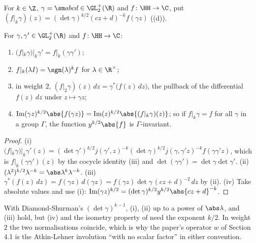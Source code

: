 \begin{definition}\label{def:modforms:slash}
For $k\in\Z$, $\gamma=\sm abcd\in\GL_2^+(\R)$ and $f\colon\HH\to\C$, put $(f|_k\gamma)(z)=(\det\gamma)^{k/2}(cz+d)^{-k}f(\gamma z)$ ((d)).
\end{definition}

\begin{lemma}\label{lem:modforms:slash}
For $\gamma,\gamma'\in\GL_2^+(\R)$ and $f\colon\HH\to\C$:
\begin{enumerate}[label=(\roman*)]
\item $(f|_k\gamma)|_k\gamma'=f|_k(\gamma\gamma')$;
\item $f|_k(\lambda I)=\sgn(\lambda)^kf$ for $\lambda\in\R^\times$;
\item in weight $2$, $(f|_2\gamma)(z)\,dz=\gamma^*\bigl(f(z)\,dz\bigr)$, the pullback of the differential $f(z)\,dz$ under $z\mapsto\gamma z$;
\item $\operatorname{Im}(\gamma z)^{k/2}\abs{f(\gamma z)}=\operatorname{Im}(z)^{k/2}\abs{(f|_k\gamma)(z)}$; so if $f|_k\gamma=f$ for all $\gamma$ in a group $\Gamma$, the function $y^{k/2}\abs{f}$ is $\Gamma$-invariant.
\end{enumerate}
\end{lemma}

\begin{proof}
(i) $(f|_k\gamma)|_k\gamma'(z)=(\det\gamma')^{k/2}j(\gamma',z)^{-k}(\det\gamma)^{k/2}j(\gamma,\gamma'z)^{-k}f(\gamma\gamma'z)$, which is $f|_k(\gamma\gamma')(z)$ by the cocycle identity
(iii) and $\det(\gamma\gamma')=\det\gamma\det\gamma'$. (ii) $(\lambda^2)^{k/2}\lambda^{-k}=\abs\lambda^k\lambda^{-k}$. (iii) $\gamma^*(f(z)\,dz)=f(\gamma z)\,d(\gamma z)=
f(\gamma z)\det\gamma\,(cz+d)^{-2}\,dz$ by (ii). (iv) Take absolute values and use (i):
$\operatorname{Im}(\gamma z)^{k/2}=(\det\gamma)^{k/2}y^{k/2}\abs{cz+d}^{-k}$.
\end{proof}

With Diamond-Shurman's $(\det\gamma)^{k-1}$, (i), (ii) up to a power of $\abs\lambda$, and (iii) hold, but (iv) and the isometry property of
 need the exponent $k/2$. In weight $2$ the two normalisations coincide, which is why the paper's operator $w$ of
Section 4.1 is the Atkin-Lehner involution ``with no scalar factor'' in either convention.

